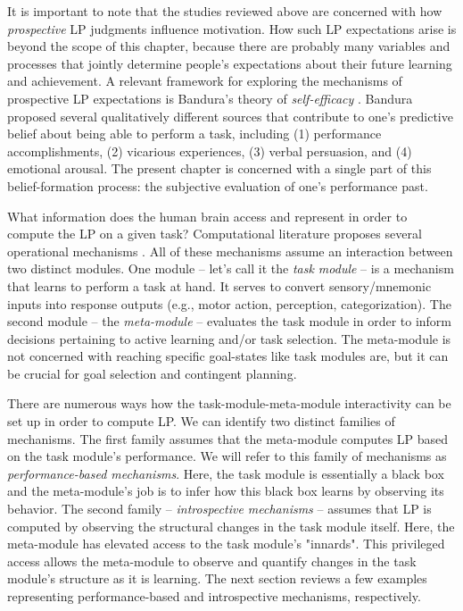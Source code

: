 It is important to note that the studies reviewed above are concerned with how \emph{prospective} \ac{LP} judgments influence motivation. How such \ac{LP} expectations arise is beyond the scope of this chapter, because there are probably many variables and processes that jointly determine people's expectations about their future learning and achievement. A relevant framework for exploring the mechanisms of prospective \ac{LP} expectations is Bandura's theory of \emph{self-efficacy} \parencite{bandura_self-efficacy_1977}. Bandura proposed several qualitatively different sources that contribute to one's predictive belief about being able to perform a task, including (1) performance accomplishments, (2) vicarious experiences, (3) verbal persuasion, and (4) emotional arousal. The present chapter is concerned with a single part of this belief-formation process: the subjective evaluation of one's performance past. 

What information does the human brain access and represent in order to compute the \ac{LP} on a given task? Computational literature proposes several operational mechanisms \parencite{oudeyer_what_2007,graves_automated_2017,twomey_curiosity-based_2018,linke_adapting_2020}. All of these mechanisms assume an interaction between two distinct modules. One module -- let's call it the \emph{task module} -- is a mechanism that learns to perform a task at hand. It serves to convert sensory/mnemonic inputs into response outputs (e.g., motor action, perception, categorization). The second module -- the \emph{meta-module} -- evaluates the task module in order to inform decisions pertaining to active learning and/or task selection. The meta-module is not concerned with reaching specific goal-states like task modules are, but it can be crucial for goal selection and contingent planning. 

There are numerous ways how the task-module-meta-module interactivity can be set up in order to compute \ac{LP}. We can identify two distinct families of mechanisms. The first family assumes that the meta-module computes \ac{LP} based on the task module's performance. We will refer to this family of mechanisms as \emph{performance-based mechanisms}. Here, the task module is essentially a black box and the meta-module's job is to infer how this black box learns by observing its behavior. The second family -- \emph{introspective mechanisms} -- assumes that \ac{LP} is computed by observing the structural changes in the task module itself. Here, the meta-module has elevated access to the task module's "innards". This privileged access allows the meta-module to observe and quantify changes in the task module's structure as it is learning. The next section reviews a few examples representing performance-based and introspective mechanisms, respectively.

